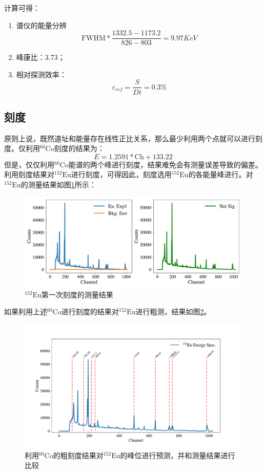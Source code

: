 \documentclass{article}
\begin{document}
计算可得：
\begin{enumerate}
    \item 谱仪的能量分辨
    \begin{equation}
        \text{FWHM}*\frac{1332.5-1173.2}{826-803} = 9.97\si{KeV}
    \end{equation}
\item 峰康比：3.73；
\item 相对探测效率：
\begin{equation}
    \varepsilon_{ref} = \frac{S}{Dt} = 0.3\%
\end{equation}
\end{enumerate}
\subsection{刻度}
原则上说，既然道址和能量存在线性正比关系，那么最少利用两个点就可以进行刻度。仅利用$^{60}\text{Co}$刻度的结果为：
\begin{equation}
    E = 1.2591*\text{Ch} + 133.22
\end{equation}
但是，仅仅利用$^{60}\text{Co}$能谱的两个峰进行刻度，结果难免会有测量误差导致的偏差。利用刻度结果对$^{152}\text{Eu}$进行刻度，可得因此，刻度选用$^{152}\text{Eu}$的各能量峰进行。对$^{152}\text{Eu}$的测量结果如图\ref{fig:152Eu_Full}所示：
\begin{figure}[htbp]
    \centering
    \includegraphics[width=\textwidth]{../plots/Eu_full_net.pdf}
    \caption{$^{152}\text{Eu}$第一次刻度的测量结果\label{fig:152Eu_Full}}
\end{figure}
如果利用上述$^{60}\text{Co}$进行刻度的结果对$^{152}\text{Eu}$进行粗测，结果如图\ref{fig:Roughly_Cali_full}。
\begin{figure}
    \centering
    \includegraphics[width=\textwidth]{../plots/Roughly_Cali_full.pdf}
    \caption{利用$^{60}\text{Co}$的粗刻度结果对$^{152}\text{Eu}$的峰位进行预测，并和测量结果进行比较\label{fig:Roughly_Cali_full}}
\end{figure}
\end{document}

